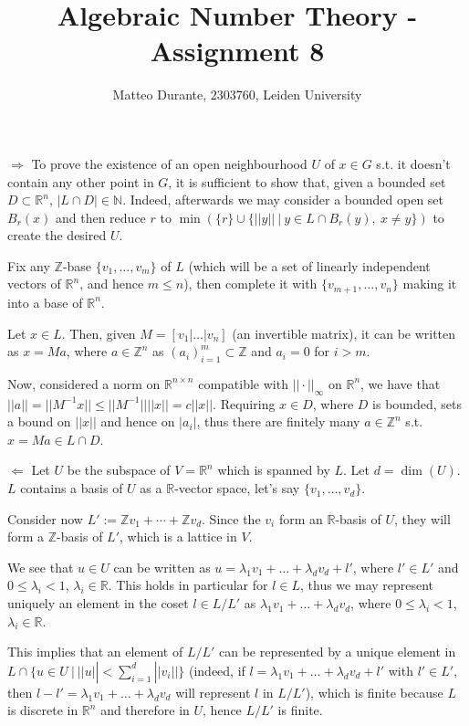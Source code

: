 \documentclass{article}
\newcommand{\numberset}{\mathbb}
\newcommand{\N}{\numberset{N}}
\newcommand{\Z}{\numberset{Z}}
\newcommand{\R}{\numberset{R}}
\newcommand{\exercise}[1]{\noindent {\bf Exercise #1}}
\begin{document}
\title{Algebraic Number Theory - Assignment 8}

\author{Matteo Durante, 2303760, Leiden University}

\maketitle

\exercise{5}

$\Rightarrow$ To prove the existence of an open neighbourhood $U$ of $x\in G$ s.t. it doesn't contain any other point in $G$, it is sufficient to show that, given a bounded set $D\subset\R^n$, $|L\cap D|\in\N$. Indeed, afterwards we may consider a bounded open set $B_r(x)$ and then reduce $r$ to $\min(\{r\}\cup\{||y||\ |\ y\in L\cap B_r(y),\ x\neq y\})$ to create the desired $U$.

Fix any $\Z$-base $\{v_1,\ldots,v_m\}$ of $L$ (which will be a set of linearly independent vectors of $\R^n$, and hence $m\leq n$), then complete it with $\{v_{m+1},\ldots,v_n\}$ making it into a base of $\R^n$.

Let $x\in L$. Then, given $M=[v_1|\ldots|v_n]$ (an invertible matrix), it can be written as $x=Ma$, where $a\in\Z^n$ as $(a_i)_{i=1}^m\subset\Z$ and $a_i=0$ for $i>m$.

Now, considered a norm on $\R^{n\times n}$ compatible with $||\cdot||_{\infty}$ on $\R^n$, we have that $||a||=||M^{-1}x||\leq ||M^{-1}||||x||=c||x||$. Requiring $x\in D$, where $D$ is bounded, sets a bound on $||x||$ and hence on $|a_i|$, thus there are finitely many $a\in\Z^n$ s.t. $x=Ma\in L\cap D$.

$\Leftarrow$ Let $U$ be the subspace of $V=\R^n$ which is spanned by $L$. Let $d=\dim(U)$. $L$ contains a basis of $U$ as a $\R$-vector space, let's say $\{v_1,\ldots,v_d\}$.

Consider now $L':=\Z v_1+\cdots +\Z v_d$. Since the $v_i$ form an $\R$-basis of $U$, they will form a $\Z$-basis of $L'$, which is a lattice in $V$.

We see that $u\in U$ can be written as $u=\lambda_1 v_1+\ldots +\lambda_d v_d+l'$, where $l'\in L'$ and $0\leq\lambda_i<1$, $\lambda_i\in\R$. This holds in particular for $l\in L$, thus we may represent uniquely an element in the coset $l\in L/L'$ as $\lambda_1 v_1+\ldots +\lambda_d v_d$, where $0\leq\lambda_i<1$, $\lambda_i\in\R$.

This implies that an element of $L/L'$ can be represented by a unique element in $L\cap\{u\in U\ |\ ||u||<\sum_{i=1}^d ||v_i||\}$ (indeed, if $l=\lambda_1 v_1+\ldots +\lambda_d v_d+l'$ with $l'\in L'$, then $l-l'=\lambda_1 v_1+\ldots +\lambda_d v_d$ will represent $l$ in $L/L'$), which is finite because $L$ is discrete in $\R^n$ and therefore in $U$, hence $L/L'$ is finite.
\end{document}
